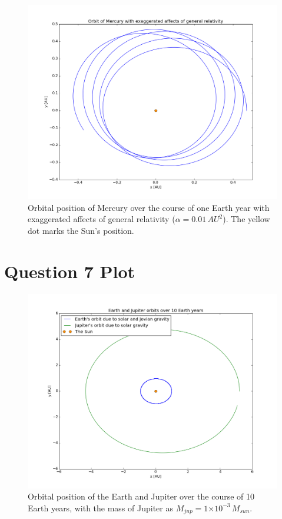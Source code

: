 \documentclass[a4paper,12pt]{article}
\providecommand{\e}[1]{\ensuremath{\times 10^{#1}}}
\begin{document}
\begin{figure}[H]
\centering
\includegraphics[width = \linewidth]{lab1q6.png}
\caption{Orbital position of Mercury over the course of one Earth year with exaggerated affects of general relativity ($\alpha = 0.01\, AU^2$). The yellow dot marks the Sun's position.}
\label{fig:q6}
\end{figure}

\section{Question 7 Plot}

\begin{figure}[H]
\centering
\includegraphics[width = \linewidth]{lab1q7.png}
\caption{Orbital position of the Earth and Jupiter over the course of 10 Earth years, with the mass of Jupiter as $M_{jup} = 1\e{-3}\, M_{sun}$.}
\label{fig:q7}
\end{figure}
\end{document}
